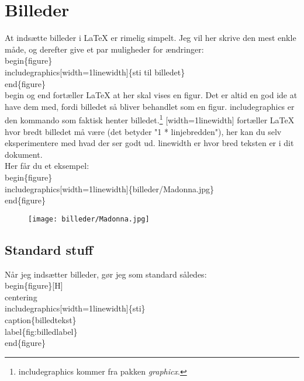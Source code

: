 
\chapter{Billeder}

At indsætte billeder i LaTeX er rimelig simpelt. Jeg vil her skrive den mest enkle måde, og derefter give et par muligheder for ændringer:\\

\indent \bs begin\{figure\}\\
\indent \bs includegraphics[width=1\bs linewidth]\{sti til billedet\}\\
\indent \bs end\{figure\}\\

\noindent
\bs begin og \bs end fortæller LaTeX at her skal vises en figur. Det er altid en god ide at have dem med, fordi billedet så bliver behandlet som en figur. \bs includegraphics er den kommando som faktisk henter billedet.\footnote{\bs includegraphics kommer fra pakken \emph{graphicx}.} [width=1\bs linewidth] fortæller LaTeX hvor bredt billedet må være (det betyder "1 * linjebredden"), her kan du selv eksperimentere med hvad der ser godt ud. \bs linewidth er hvor bred teksten er i dit dokument.\\
\noindent Her får du et eksempel:\\

\indent \bs begin\{figure\}\\
\indent \bs includegraphics[width=1\bs linewidth]\{billeder/Madonna.jpg\}\\
\indent \bs end\{figure\}\\

\begin{figure}[H]
\texttt{[image: billeder/Madonna.jpg]}
\end{figure}

\section{Standard stuff}

Når jeg indsætter billeder, gør jeg som standard således:\\

\indent \bs begin\{figure\}[H]\\
\indent \bs centering\\
\indent \bs includegraphics[width=1\bs linewidth]\{sti\}\\
\indent \bs caption\{billedtekst\}\\
\indent \bs label\{fig:billedlabel\}\\
\indent \bs end\{figure\}\\

